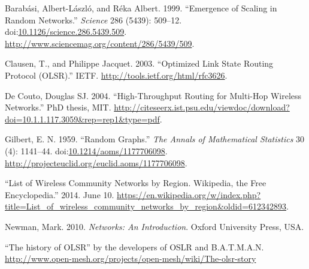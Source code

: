 \documentclass[a4paper,11pt,twoside,openleft]{memoir}
\begin{document}
Barabási, Albert-László, and Réka Albert. 1999. ``Emergence of Scaling
in Random Networks.'' \emph{Science} 286 (5439): 509--12.\\
doi:\href{http://dx.doi.org/10.1126/science.286.5439.509}{10.1126/science.286.5439.509}.
\url{http://www.sciencemag.org/content/286/5439/509}.

Clausen, T., and Philippe Jacquet. 2003. ``Optimized Link State Routing
Protocol (OLSR).'' IETF. \url{http://tools.ietf.org/html/rfc3626}.

De Couto, Douglas {SJ}. 2004. ``High-Throughput Routing for Multi-Hop
Wireless Networks.'' PhD thesis, MIT.
\url{http://citeseerx.ist.psu.edu/viewdoc/download?doi=10.1.1.117.3059\&rep=rep1\&type=pdf}.

Gilbert, E. N. 1959. ``Random Graphs.'' \emph{The Annals of Mathematical
Statistics} 30 (4): 1141--44.
doi:\href{http://dx.doi.org/10.1214/aoms/1177706098}{10.1214/aoms/1177706098}.
\url{http://projecteuclid.org/euclid.aoms/1177706098}.

``List of Wireless Community Networks by Region. Wikipedia, the Free
Encyclopedia.'' 2014. June 10.
\url{https://en.wikipedia.org/w/index.php?title=List_of_wireless_community_networks_by_region\&oldid=612342893}.

Newman, Mark. 2010. \emph{Networks: An Introduction}. Oxford University
Press, USA.

``The history of OLSR'' by the developers of OSLR and B.A.T.M.A.N.
\url{http://www.open-mesh.org/projects/open-mesh/wiki/The-olsr-story}
\end{document}
